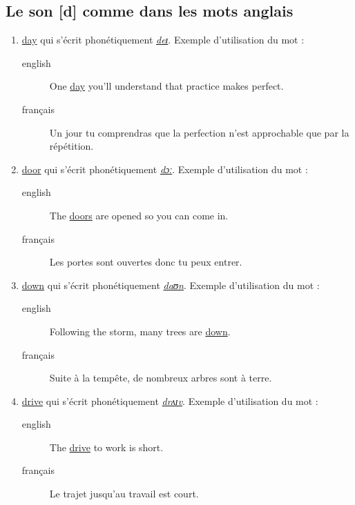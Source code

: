 \subsection{Le son [d] comme dans les mots anglais}
\label{sec:org6c913ef}
\begin{enumerate}
\item \href{http://www.wordreference.com/enfr/day}{day} qui s'écrit phonétiquement \href{https://en.oxforddictionaries.com/definition/day}{\emph{deɪ}}. Exemple d'utilisation du mot :
\begin{description}
\item[{english}] \textenglish{One \href{https://youtu.be/sl9voSKJmEU}{day} you'll understand that practice makes perfect.}
\item[{français}] Un jour tu comprendras que la perfection n'est
approchable que par la répétition.
\end{description}
\item \href{http://www.wordreference.com/enfr/door}{door} qui s'écrit phonétiquement \href{https://en.oxforddictionaries.com/definition/door}{\emph{dɔː}}. Exemple d'utilisation du mot :
\begin{description}
\item[{english}] \textenglish{The \href{https://youtu.be/eDW\_yAwaHnc}{doors} are opened so you can come in.}
\item[{français}] Les portes sont ouvertes donc tu peux entrer.
\end{description}
\item \href{http://www.wordreference.com/enfr/down}{down} qui s'écrit phonétiquement \href{https://en.oxforddictionaries.com/definition/down}{\emph{daʊn}}. Exemple d'utilisation du mot :
\begin{description}
\item[{english}] \textenglish{Following the storm, many trees are \href{https://youtu.be/pn4oaQNiNQc}{down}.}
\item[{français}] Suite à la tempête, de nombreux arbres sont à terre.
\end{description}
\item \href{http://www.wordreference.com/enfr/drive}{drive} qui s'écrit phonétiquement \href{https://en.oxforddictionaries.com/definition/drive}{\emph{drʌɪv}}. Exemple d'utilisation du mot :
\begin{description}
\item[{english}] \textenglish{The \href{https://youtu.be/mPBCO17bFms}{drive} to work is short.}
\item[{français}] Le trajet jusqu'au travail est court.
\end{description}
\end{enumerate}
